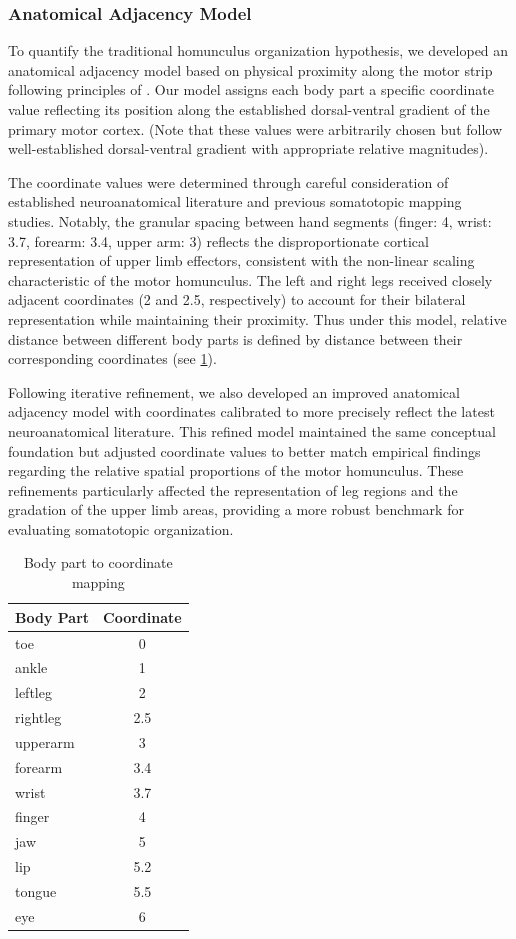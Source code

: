\documentclass{article}
\begin{document}
\subsubsection{Anatomical Adjacency Model}
To quantify the traditional homunculus organization hypothesis, we developed an anatomical adjacency model based on physical proximity along the motor strip following principles of \cite{data}. Our model assigns each body part a specific coordinate value reflecting its position along the established dorsal-ventral gradient of the primary motor cortex. (Note that these values were arbitrarily chosen but follow well-established dorsal-ventral gradient with appropriate relative magnitudes). 

The coordinate values were determined through careful consideration of established neuroanatomical literature and previous somatotopic mapping studies. Notably, the granular spacing between hand segments (finger: 4, wrist: 3.7, forearm: 3.4, upper arm: 3) reflects the disproportionate cortical representation of upper limb effectors, consistent with the non-linear scaling characteristic of the motor homunculus. The left and right legs received closely adjacent coordinates (2 and 2.5, respectively) to account for their bilateral representation while maintaining their proximity. Thus under this model, relative distance between different body parts is defined by distance between their corresponding coordinates (see \ref{tab:coords}).

Following iterative refinement, we also developed an improved anatomical adjacency model with coordinates calibrated to more precisely reflect the latest neuroanatomical literature. This refined model maintained the same conceptual foundation but adjusted coordinate values to better match empirical findings regarding the relative spatial proportions of the motor homunculus. These refinements particularly affected the representation of leg regions and the gradation of the upper limb areas, providing a more robust benchmark for evaluating somatotopic organization.

\begin{table}[h]
\centering
\begin{tabular}{|l|c|}
\hline
\textbf{Body Part} & \textbf{Coordinate} \\
\hline
toe & 0 \\
ankle & 1 \\
leftleg & 2 \\
rightleg & 2.5 \\
upperarm & 3 \\
forearm & 3.4 \\
wrist & 3.7 \\
finger & 4 \\
jaw & 5 \\
lip & 5.2 \\
tongue & 5.5 \\
eye & 6 \\
\hline
\end{tabular}
\caption{Body part to coordinate mapping}
\label{tab:coords}
\end{table}
\end{document}
